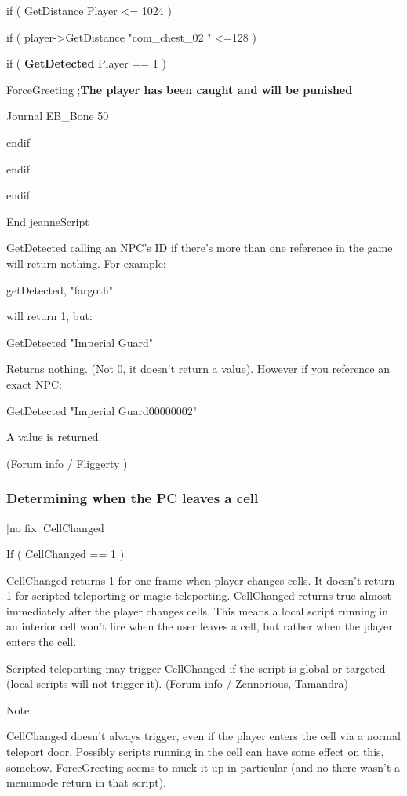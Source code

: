 \documentclass[
]{article}
\begin{document}
if ( GetDistance Player \textless= 1024 )

if ( player-\textgreater GetDistance "com\_chest\_02 " \textless=128 )

if ( \textbf{GetDetected} Player == 1 )

ForceGreeting ;\textbf{The player has been caught and will be punished}

Journal EB\_Bone 50

endif

endif

endif

End jeanneScript

GetDetected calling an NPC's ID if there's more than one reference in
the game will return nothing. For example:

getDetected, "fargoth"

will return 1, but:

GetDetected "Imperial Guard"

Returns nothing. (Not 0, it doesn't return a value). However if you
reference an exact NPC:

GetDetected "Imperial Guard00000002"

A value is returned.

(Forum info / Fliggerty )

\hypertarget{determining-when-the-pc-leaves-a-cell}{%
\subsubsection{Determining when the PC leaves a
cell}\label{determining-when-the-pc-leaves-a-cell}}

{[}no fix{]} CellChanged

If ( CellChanged == 1 )

CellChanged returns 1 for one frame when player changes cells. It
doesn't return 1 for scripted teleporting or magic teleporting.
CellChanged returns true almost immediately after the player changes
cells. This means a local script running in an interior cell won't fire
when the user leaves a cell, but rather when the player enters the cell.

Scripted teleporting may trigger CellChanged if the script is global or
targeted (local scripts will not trigger it). (Forum info / Zennorious,
Tamandra)

Note:

CellChanged doesn't always trigger, even if the player enters the cell
via a normal teleport door. Possibly scripts running in the cell can
have some effect on this, somehow. ForceGreeting seems to muck it up in
particular (and no there wasn't a menumode return in that script).
\end{document}
